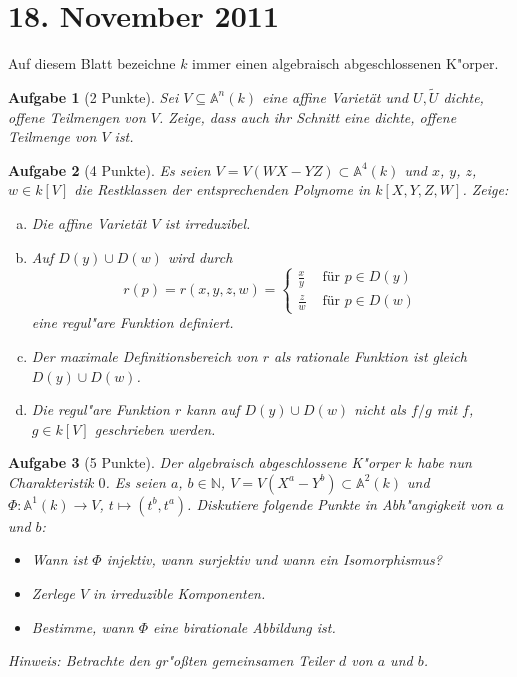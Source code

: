 \documentclass[a4paper, 12pt, numbers=noendperiod, chapterprefix=true, headsepline]{scrbook}
\theoremstyle{break}
\newtheorem{Aufg}{Aufgabe}
\theoremstyle{nonumberbreak}
\theoremstyle{nonumberplain}
\newcommand{\N}{\mathbb{N}}
\newcommand{\A}{\mathbb{A}}
\begin{document}
\newpage
\section{18. November 2011}
\setcounter{Aufg}{0}
\setcounter{Loes}{0}

Auf diesem Blatt bezeichne $k$ immer einen algebraisch abgeschlossenen K"orper.

\begin{Aufg}[2 Punkte]
Sei $V \subseteq \A^n(k)$ eine affine Variet\"at und $U,\tilde{U}$ dichte, offene Teilmengen von $V$. Zeige, dass auch ihr Schnitt eine dichte, offene Teilmenge von $V$ ist.
\end{Aufg}

\begin{Aufg}[4 Punkte]
Es seien $V = V(WX-YZ)\subset \A^4(k)$ und $x$, $y$, $z$, $w\in k[V]$ die Restklassen der entsprechenden Polynome in $k[X,Y,Z,W]$. Zeige:
\begin{enumerate}[a)]
	\item Die affine Varietät $V$ ist irreduzibel.
	\item Auf $D(y)\cup D(w)$ wird durch
		\[r(p) = r(x,y,z,w) = \begin{cases}
			\frac{x}{y} & \text{ für } p\in D(y)\\
			\frac{z}{w} & \text{ für } p\in D(w)
		\end{cases}\]
	eine regul"are Funktion definiert. 
	\item Der maximale Definitionsbereich von $r$ als rationale Funktion ist gleich $D(y)\cup D(w)$.
	\item Die regul"are Funktion $r$ kann auf $D(y)\cup D(w)$ nicht als $f/g$ mit $f$, $g\in k[V]$ geschrieben werden.
\end{enumerate}\end{Aufg}

\begin{Aufg}[5 Punkte]
Der algebraisch abgeschlossene K"orper $k$ habe nun Charakteristik $0$.
Es seien $a$, $b\in \N$, $V = V(X^a - Y^b)\subset \A^2(k)$ und $\Phi \colon\A^1(k)\to V$, $t\mapsto (t^b,t^a)$. Diskutiere folgende Punkte in Abh"angigkeit von $a$ und $b$:
\begin{itemize}
	\item Wann ist $\Phi$ injektiv, wann surjektiv und wann ein Isomorphismus? 
	\item Zerlege $V$ in irreduzible Komponenten.
	\item Bestimme, wann $\Phi$ eine birationale Abbildung ist.
\end{itemize}
\textit{Hinweis: Betrachte den gr"o\ss ten gemeinsamen Teiler $d$ von $a$ und $b$.}
\end{Aufg}
\end{document}
